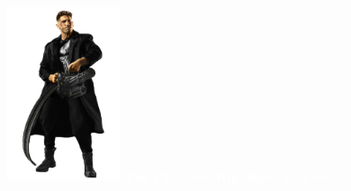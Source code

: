 \documentclass[12pt]{article}
\begin{document}
\newpage
{}
\hypertarget{punisher}{}
\begin{center}
    \vspace*{2cm}
    \includegraphics[width=0.25\textwidth]{PUNISHER1.PNG}
    \vspace{0.5cm}
    {\Huge \textbf{\textcolor{white}{The Punisher Highlights \& Events}}}
\end{center}
\end{document}
